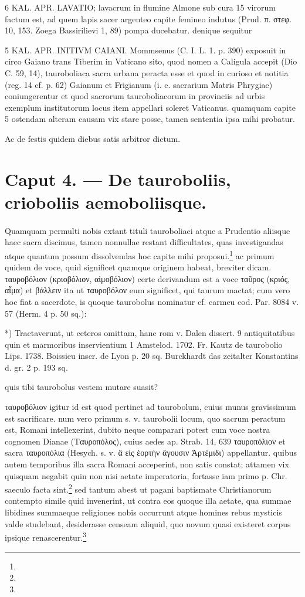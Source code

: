 \documentclass[a4paper, 11pt, oneside, polutonikogreek, german]{article}
\begin{document}
6 KAL. APR. LAVATIO; lavacrum in flumine Almone sub cura 15 virorum factum est, ad quem lapis sacer argenteo capite femineo indutus (Prud. π. στεφ. 10, 153. Zoega Bassirilievi 1, 89) pompa ducebatur. denique sequitur

5 KAL. APR. INITIVM CAIANI. Mommsenus (C. I. L. 1. p. 390) exposuit in circo Gaiano trans Tiberim in Vaticano sito, quod nomen a Caligula accepit (Dio C. 59, 14), tauroboliaca sacra urbana peracta esse et quod in curioso et notitia (reg. 14 cf. p. 62) Gaianum et Frigianum (i. e. sacrarium Matris Phrygiae) coniungerentur et quod sacrorum tauroboliacorum in provinciis ad urbis exemplum institutorum locus item appellari soleret Vaticanus. quamquam capite 5 ostendam alteram causam vix stare posse, tamen sententia ipsa mihi probatur.

Ac de festis quidem diebus satis arbitror dictum.
\clearpage
\section{Caput 4. --- De tauroboliis, crioboliis aemoboliisque.}
\paragraph{}
Quamquam permulti nobis extant tituli tauroboliaci atque a Prudentio aliisque haec sacra discimus, tamen nonnullae restant difficultates, quas investigandas atque quantum possum dissolvendas hoc capite mihi proposui.\footnote{} ac primum quidem de voce, quid significet quamque originem habeat, breviter dicam. ταυροβόλιον (κριοβόλιον, αἱμοβόλιον) certe derivandum est a voce ταῦρος (κριός, αἷμα) et βάλλειν ita ut ταυροβόλον eum significet, qui taurum mactat; cum vero hoc fiat a sacerdote, is quoque taurobolus nominatur cf. carmeu cod. Par. 8084 v. 57 (Herm. 4 p. 50 sq.):

*) Tractaverunt, ut ceteros omittam, hanc rom v. Dalen dissert. 9 antiquitatibus quin et marmoribus inservientium 1 Amstelod. 1702. Fr. Kautz de taurobolio Lips. 1738. Boissieu inscr. de Lyon p. 20 sq. Burckhardt das zeitalter Konstantins d. gr. 2 p. 193 sq.

quis tibi taurobolus vestem mutare suasit?

ταυροβόλιον igitur id est quod pertinet ad taurobolum, cuius munus gravissimum est sacrificare. num vero primum s. v. taurobolii locum, quo sacrum peractum est, Romani intellexerint, dubito neque comparari potest cum voce nostra cognomen Dianae (Ταυροπόλος), cuius aedes ap. Strab. 14, 639 ταυροπόλιον et sacra ταυροπόλια (Hesych. s. v. ἃ εἰς ἑορτὴν ἄγουσιν Ἀρτέμιδι) appellantur. quibus autem temporibus illa sacra Romani acceperint, non satis constat; attamen vix quisquam negabit quin non nisi aetate imperatoria, fortasse iam primo p. Chr. saeculo facta sint.\footnote{} sed tantum abest ut pagani baptismate Christianorum contempto simile quid invenerint, ut contra eos quoque illa aetate, qua summae libidines summaeque religiones nobis occurrunt atque homines rebus mysticis valde studebant, desiderasse censeam aliquid, quo novum quasi existeret corpus ipsique renascerentur.\footnote{}
\end{document}
